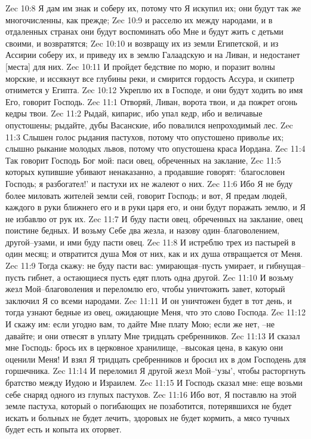 Zec 10:8  Я дам им знак и соберу их, потому что Я искупил их; они будут так же многочисленны, как прежде;
Zec 10:9  и расселю их между народами, и в отдаленных странах они будут воспоминать обо Мне и будут жить с детьми своими, и возвратятся;
Zec 10:10  и возвращу их из земли Египетской, и из Ассирии соберу их, и приведу их в землю Галаадскую и на Ливан, и недостанет [места] для них.
Zec 10:11  И пройдет бедствие по морю, и поразит волны морские, и иссякнут все глубины реки, и смирится гордость Ассура, и скипетр отнимется у Египта.
Zec 10:12  Укреплю их в Господе, и они будут ходить во имя Его, говорит Господь.
Zec 11:1  Отворяй, Ливан, ворота твои, и да пожрет огонь кедры твои.
Zec 11:2  Рыдай, кипарис, ибо упал кедр, ибо и величавые опустошены; рыдайте, дубы Васанские, ибо повалился непроходимый лес.
Zec 11:3  Слышен голос рыдания пастухов, потому что опустошено приволье их; слышно рыкание молодых львов, потому что опустошена краса Иордана.
Zec 11:4  Так говорит Господь Бог мой: паси овец, обреченных на заклание,
Zec 11:5  которых купившие убивают ненаказанно, а продавшие говорят: `благословен Господь; я разбогател!' и пастухи их не жалеют о них.
Zec 11:6  Ибо Я не буду более миловать жителей земли сей, говорит Господь; и вот, Я предам людей, каждого в руки ближнего его и в руки царя его, и они будут поражать землю, и Я не избавлю от рук их.
Zec 11:7  И буду пасти овец, обреченных на заклание, овец поистине бедных. И возьму Себе два жезла, и назову один--благоволением, другой--узами, и ими буду пасти овец.
Zec 11:8  И истреблю трех из пастырей в один месяц; и отвратится душа Моя от них, как и их душа отвращается от Меня.
Zec 11:9  Тогда скажу: не буду пасти вас: умирающая--пусть умирает, и гибнущая--пусть гибнет, а остающиеся пусть едят плоть одна другой.
Zec 11:10  И возьму жезл Мой--благоволения и переломлю его, чтобы уничтожить завет, который заключил Я со всеми народами.
Zec 11:11  И он уничтожен будет в тот день, и тогда узнают бедные из овец, ожидающие Меня, что это слово Господа.
Zec 11:12  И скажу им: если угодно вам, то дайте Мне плату Мою; если же нет, --не давайте; и они отвесят в уплату Мне тридцать сребренников.
Zec 11:13  И сказал мне Господь: брось их в церковное хранилище, --высокая цена, в какую они оценили Меня! И взял Я тридцать сребренников и бросил их в дом Господень для горшечника.
Zec 11:14  И переломил Я другой жезл Мой--`узы', чтобы расторгнуть братство между Иудою и Израилем.
Zec 11:15  И Господь сказал мне: еще возьми себе снаряд одного из глупых пастухов.
Zec 11:16  Ибо вот, Я поставлю на этой земле пастуха, который о погибающих не позаботится, потерявшихся не будет искать и больных не будет лечить, здоровых не будет кормить, а мясо тучных будет есть и копыта их оторвет.
